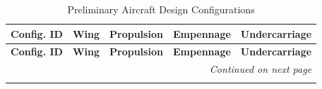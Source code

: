 \begin{longtable}{|c|c|c|p{2.5cm}|p{4.5cm}|}
    \caption{Preliminary Aircraft Design Configurations} \label{Aircraft_Configurations_Table} \\
    
    \hline
    \textbf{Config. ID} & \textbf{Wing} & \textbf{Propulsion} & \textbf{Empennage} & \textbf{Undercarriage} \\
    \hline\hline
    \endfirsthead

    \hline
    \textbf{Config. ID} & \textbf{Wing} & \textbf{Propulsion} & \textbf{Empennage} & \textbf{Undercarriage} \\
    \hline\hline
    \endhead

    \hline
    \multicolumn{5}{r}{\textit{Continued on next page}} \\
    \endfoot

    \hline
    \endlastfoot


\end{longtable}

